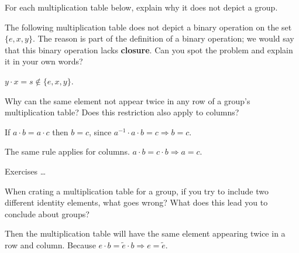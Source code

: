 \begin{questions}
	\question For each multiplication table below, explain why it does not depict a group.
	
	\question The following multiplication table does not depict a binary operation on the set $\{e,x,y\}$. The reason is part of the definition of a binary operation; we would say that this binary operation lacks \textbf{closure}. Can you spot the problem and explain it in your own words?
	\begin{solution}
		\par $y\cdot x = s\not \in \{ e,x,y\}$.
	\end{solution}

	\question Why can the same element not appear twice in any row of a group's multiplication table? Does this restriction also apply to columns?
	\begin{solution}
		\par If $a\cdot b = a\cdot c$ then $b=c$, since $a^{-1}\cdot a\cdot b = c \Rightarrow b = c$.
		\par The same rule applies for columns. $a\cdot b = c\cdot b \Rightarrow a=c$.
	\end{solution}

	\question Exercises \ldots
	
	\question When crating a multiplication table for a group, if you try to include two different identity elements, what goes wrong? What does this lead you to conclude about groups?
	\begin{solution}
		\par Then the multiplication table will have the same element appearing twice in a row and column. Because $e\cdot b = \tilde e\cdot b \Rightarrow e=\tilde e$.
	\end{solution}


\end{questions}
